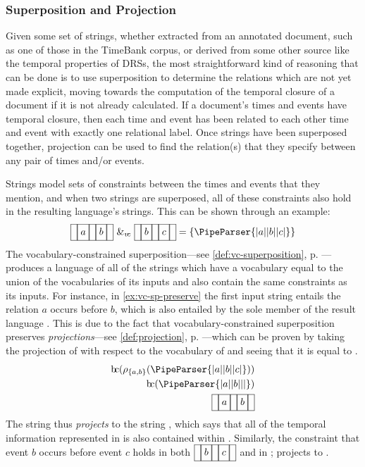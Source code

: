 \documentclass[a4paper,12pt,leqno]{article}
\newcommand{\bc}{{\rm b\!c}}
\newcommand{\vph}[1]{\vphantom{#1}}
\newcommand{\ebox}[1]{\fbox{$\vph{'(),}#1$}}
\newcommand{\nbBefore}[2]{\ebox{#1}\ebox{}\ebox{#2}}
\newcommand{\Before}[2]{\ebox{}\nbBefore{#1}{#2}\ebox{}}
\newcommand{\spvc}{~\&_{v\!c}~}
\newcommand{\EventString}[1]{%
	\renewcommand*{\do}[1]{\ebox{##1}}%
	\PipeParser{#1}%
}
\begin{document}
\subsubsection{Superposition and Projection}\label{ssub:superposition}
Given some set of strings, whether extracted from an annotated document, such as one of those in the TimeBank \citep{pustejovsky2006timebank} corpus, or derived from some other source like the temporal properties of DRSs, the most straightforward kind of reasoning that can be done is to use superposition to determine the relations which are not yet made explicit, moving towards the computation of the temporal closure of a document if it is not already calculated. If a document's times and events have temporal closure, then each time and event has been related to each other time and event with exactly one relational label. Once strings have been superposed together, projection can be used to find the relation(s) that they specify between any pair of times and/or events.

Strings model sets of constraints between the times and events that they mention, and when two strings are superposed, all of these constraints also hold in the resulting language's strings. This can be shown through an example:
\begin{align}
	\Before{a}{b} \spvc \Before{b}{c} = \{\EventString{{}|a|{}|b|{}|c|{}}\}\label{ex:vc-sp-preserve}
\end{align}
The vocabulary-constrained superposition---see \cref{def:vc-superposition}, p. \pageref{def:vc-superposition}---produces a language of all of the strings which have a vocabulary equal to the union of the vocabularies of its inputs and also contain the same constraints as its inputs. For instance, in \cref{ex:vc-sp-preserve} the first input string \Before{a}{b} entails the relation $a$ occurs before $b$, which is also entailed by the sole member of the result language \EventString{{}|a|{}|b|{}|c|{}}. This is due to the fact that vocabulary-constrained superposition preserves \textit{projections}---see \cref{def:projection}, p. \pageref{def:projection}---which can be proven by taking the projection of \EventString{{}|a|{}|b|{}|c|{}} with respect to the vocabulary of \EventString{{}|a|{}|b|{}} and seeing that it is equal to \EventString{{}|a|{}|b|{}}.
\begin{align}
\bc(\rho_{\{a,b\}}(\EventString{{}|a|{}|b|{}|c|{}}))\\ \notag
\bc(\EventString{{}|a|{}|b|{}|{}|{}})\\ \notag
\Before{a}{b}
\end{align}
The string \EventString{{}|a|{}|b|{}|c|{}} thus \textit{projects} to the string \EventString{{}|a|{}|b|{}}, which says that all of the temporal information represented in \EventString{{}|a|{}|b|{}} is also contained within \EventString{{}|a|{}|b|{}|c|{}}. Similarly, the constraint that event $b$ occurs before event $c$ holds in both $\Before{b}{c}$ and in \EventString{{}|a|{}|b|{}|c|{}}; \EventString{{}|a|{}|b|{}|c|{}} projects to \EventString{{}|b|{}|c|{}}.
\end{document}
